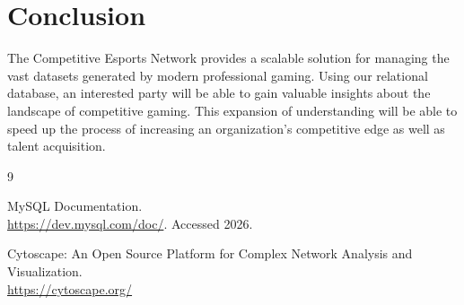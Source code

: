 \documentclass[sigconf]{acmart}
\begin{document}
\section{Conclusion}
The Competitive Esports Network provides a scalable solution for managing the vast datasets generated by modern professional gaming. Using our relational database, an interested party will be able to gain valuable insights about the landscape of competitive gaming.  This expansion of understanding will be able to speed up the process of increasing an organization's competitive edge as well as talent acquisition.


\begin{thebibliography}{9}

MySQL Documentation. \\
\url{https://dev.mysql.com/doc/}. Accessed 2026.

Cytoscape: An Open Source Platform for Complex Network Analysis and Visualization. \\
\url{https://cytoscape.org/}

\end{thebibliography}
\end{document}
